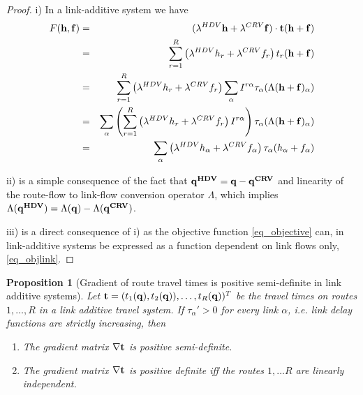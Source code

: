 \documentclass[a4paper,11pt]{article}
\newtheorem{proposition}[theorem]{Proposition}
\begin{document}
\begin{proof}
i) In a link-additive system we have
\begin{eqnarray*}
F(\bold{h},\bold{f}) &=& (\lambda^{HDV} \bold{h} + \lambda^{CRV} \bold{f}) \cdot \bold{t}(\bold{h} + \bold{f}) \\&=& \sum_{r=1}^R \left(\lambda^{HDV} {h_r} + \lambda^{CRV} {f_r}\right) t_r(\bold{h} + \bold{f})\\
&=& \sum_{r=1}^R \left(\lambda^{HDV} {h_r} + \lambda^{CRV} {f_r}\right) \sum_\alpha I^{r\alpha} \tau_\alpha(\Lambda(\bold{h} + \bold{f})_\alpha)\\
&=&  \sum_\alpha \left(\sum_{r=1}^R \left(\lambda^{HDV} {h_r} + \lambda^{CRV} {f_r}\right)I^{r\alpha}\right) \tau_\alpha(\Lambda(\bold{h} + \bold{f})_\alpha)  \\
&=& \sum_\alpha \left(\lambda^{HDV}h_\alpha + \lambda^{CRV}f_\alpha\right)\tau_\alpha(h_\alpha + f_\alpha)
\end{eqnarray*}

ii) is a simple consequence of the fact that $\bold{q^{HDV}} = \bold{q} - \bold{q^{CRV}}$ and linearity of the route-flow to link-flow conversion operator $\Lambda$, which implies $\Lambda(\bold{q^{HDV}}) = \Lambda(\bold{q}) - \Lambda(\bold{q^{CRV}})$. 

iii) is a direct consequence of i) as the objective function \eqref{eq_objective} can, in link-additive systems be expressed as a function dependent on link flows only, \eqref{eq_objlink}. 
\end{proof}

\begin{proposition}[Gradient of route travel times is positive semi-definite in link additive systems]
\label{Prop_grad}
Let $\bold{t} = (t_1(\bold{q}), t_2(\bold{q})), \dots, t_R(\bold{q}))^T$ be the travel times on routes $1,\dots, R$ in a link additive travel system. If $\tau_\alpha' > 0$ for every link $\alpha$, i.e. link delay functions are strictly increasing, then 
\begin{enumerate}
\item[i)] The gradient matrix $\nabla \bold{t}$ is positive semi-definite.
\item[ii)] The gradient matrix $\nabla \bold{t}$ is positive definite iff the routes $1, \dots R$ are linearly independent.
\end{enumerate}
\end{proposition}
\end{document}
